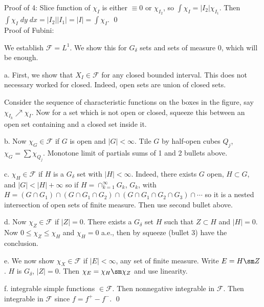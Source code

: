 Proof of 4: Slice function of $\chi_I$ is either $\equiv 0$ or $\chi_{I_2}$, so $\int \chi_I= |I_2| \chi_{I_1}$. Then $\int \chi_I \;dy \; dx= |I_2| |I_1|= |I|= \int \chi_I$. \qed \\






Proof of Fubini:

We establish $\mathcal{F}= L^1$. We show this for $G_\delta$ sets and sets of measure 0, which will be enough. 

a. First, we show that $X_I \in \mathcal{F}$ for any closed bounded interval. This does not necessary worked for closed. Indeed, open sets are union of closed sets. 


Consider the sequence of characteristic functions on the boxes in the figure, say $\chi_{I_k} \nearrow \chi_I$. Now for a set which is not open or closed, squeeze this between an open set containing and a closed set inside it.

b. Now $\chi_G \in \mathcal{F}$ if $G$ is open and $|G|<\infty$. Tile $G$ by half-open cubes $Q_j$, $\chi_G= \sum \chi_{Q_j}$. Monotone limit of partials sums of 1 and 2 bullets above. 

c. $\chi_{H} \in \mathcal{F}$ if $H$ is a $G_\delta$ set with $|H|<\infty$. Indeed, there exists $G$ open, $H \subset G$, and $|G|<|H|+\infty$ so if $H= \cap_{k=1}^\infty G_k$, $G_k$, with $H= (G \cap G_1) \cap (G\cap G_1 \cap G_2) \cap (G \cap G_1 \cap G_2 \cap G_3) \cap \cdots$ so it is a nested intersection of open sets of finite measure. Then use second bullet above. 

d. Now $\chi_Z \in \mathcal{F}$ if $|Z|=0$. There exists a $G_\delta$ set $H$ such that $Z \subset H$ and $|H|=0$. Now $0 \leq \chi_Z \leq \chi_H$ and $\chi_H=0$ a.e., then by squeeze (bullet 3) have the conclusion. 

e. We now show $\chi_X \in \mathcal{F}$ if $|E|<\infty$, any set of finite measure. Write $E= H \sm Z$. $H$ is $G_\delta$, $|Z|=0$. Then $\chi_E= \chi_H \sm \chi_Z$ and use linearity. 

f. integrable simple functions $\in \mathcal{F}$. Then nonnegative integrable in $\mathcal{F}$. Then integrable in $\mathcal{F}$ since $f= f^+ - f^-$. \qed \\





